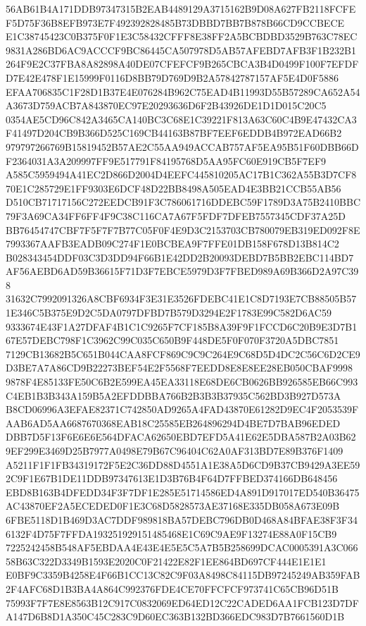 \documentclass[UTF8,fontset=fandol,zihao=-4,a4paper]{ctexart}
\begin{document}
{{56AB61B4A171DDB97347315B2EAB4489129A3715162B9D08A627FB2118FCFEF5D75F36B8EFB973E7F492392828485B73DBBD7BB7B878B66CD9CCBECE
E1C38745423C0B375F0F1E3C58432CFFF8E38FF2A5BCBDBD3529B763C78EC9831A286BD6AC9ACCCF9BC86445CA507978D5AB57AFEBD7AFB3F1B232B1
264F9E2C37FBA8A82898A40DE07CFEFCF9B265CBCA3B4D0499F100F7EFDFD7E42E478F1E15999F0116D8BB79D769D9B2A57842787157AF5E4D0F5886
EFAA706835C1F28D1B37E4E076284B962C75EAD4B11993D55B57289CA652A54A3673D759ACB7A843870EC97E20293636D6F2B43926DE1D1D015C20C5
0354AE5CD96C842A3465CA140BC3C68E1C39221F813A63C60C4B9E47432CA3F41497D204CB9B366D525C169CB44163B87BF7EEF6EDDB4B972EAD66B2
979797266769B15819452B57AE2C55AA949ACCAB757AF5EA95B51F60DBB66DF2364031A3A209997FF9E517791F84195768D5AA95FC60E919CB5F7EF9
A585C5959494A41EC2D866D2004D4EEFC445810205AC17B1C362A55B3D7CF870E1C285729E1FF9303E6DCF48D22BB8498A505EAD4E3BB21CCB55AB56
D510CB71717156C272EEDCB91F3C786061716DDEBC59F1789D3A75B2410BBC79F3A69CA34FF6FF4F9C38C116CA7A67F5FDF7DFEB7557345CDF37A25D
BB76454747CBF7F5F7F7B77C05F0F4E9D3C2153703CB780079EB319ED092F8E7993367AAFB3EADB09C274F1E0BCBEA9F7FFE01DB158F678D13B814C2
B028343454DDF03C3D3DD94F66B1E42DD2B20093DEBD7B5BB2EBC114BD7AF56AEBD6AD59B36615F71D3F7EBCE5979D3F7FBED989A69B366D2A97C398
31632C7992091326A8CBF6934F3E31E3526FDEBC41E1C8D7193E7CB88505B571E346C5B375E9D2C5DA0797DFBD7B579D3294E2F1783E99C582D6AC59
9333674E43F1A27DFAF4B1C1C9265F7CF185B8A39F9F1FCCD6C20B9E3D7B167E57DEBC798F1C3962C99C035C650B9F448DE5F0F070F3720A5DBC7851
7129CB13682B5C651B044CAA8FCF869C9C9C264E9C68D5D4DC2C56C6D2CE9D3BE7A7A86CD9B22273BEF54E2F5568F7EEDD8E8E8EE28EB050CBAF9998
9878F4E85133FE50C6B2E599EA45EA33118E68DE6CB0626BB926585EB66C993C4EB1B3B343A159B5A2EFDDBBA766B2B3B3B37935C562BD3B927D573A
B8CD06996A3EFAE82371C742850AD9265A4FAD43870E61282D9EC4F2053539FAAB6AD5AA6687670368EAB18C25585EB264896294D4BE7D7BAB96EDED
DBB7D5F13F6E6E6E564DFACA62650EBD7EFD5A41E62E5DBA587B2A03B629EF299E3469D25B7977A0498E79B67C96404C62A0AF313BD7E89B376F1409
A5211F1F1FB34319172F5E2C36DD88D4551A1E38A5D6CD9B37CB9429A3EE592C9F1E67B1DE11DDB97347613E1D3B76B4F64D7FFBED374166DB648456
EBD8B163B4DFEDD34F3F7DF1E285E51714586ED4A891D917017ED540B36475AC43870EF2A5ECEDED0F1E3C68D5828573AE37168E335DB058A673E09B
6FBE5118D1B469D3AC7DDF989818BA57DEBC796DB0D468A84BFAE38F3F346132F4D75F7FFDA193251929151485468E1C69C9AE9F13274E88A0F15CB9
7225242458B548AF5EBDAA4E43E4E5E5C5A7B5B258699DCAC0005391A3C06658B63C322D3349B1593E2020C0F21422E82F1EE864BD697CF444E1E1E1
E0BF9C3359B4258E4F66B1CC13C82C9F03A8498C84115DB97245249AB359FAB2F4AFC68D1B3BA4A864C992376FDE4CE70FFCFCF973741C65CB96D51B
75993F7F7E8E8563B12C917C0832069ED64ED12C22CADED6AA1FCB123D7DFA147D6B8D1A350C45C283C9D60EC363B132BD366EDC983D7B7661560D1B
}}
\end{document}
